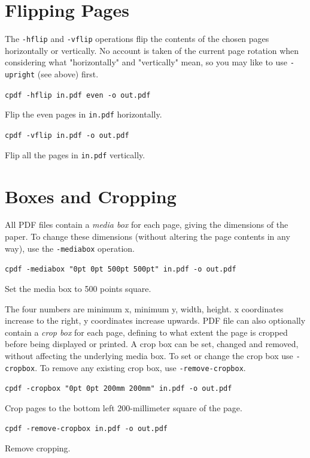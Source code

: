 \documentclass{book}
\begin{document}
  \section{Flipping Pages}
  The \texttt{-hflip} and \texttt{-vflip} operations flip the contents of the
chosen pages horizontally or vertically. No account is taken of the current
page rotation when considering what "horizontally" and "vertically" mean, so you may like to use \texttt{-upright} (see above) first.
  \begin{framed}
    \noindent\small\verb!cpdf -hflip in.pdf even -o out.pdf!

    \vspace{2.5mm}
    \noindent Flip the even pages in \texttt{in.pdf} horizontally.

    \vspace{2.5mm}
    \noindent\verb!cpdf -vflip in.pdf -o out.pdf!

    \vspace{2.5mm}
    \noindent Flip all the pages in \texttt{in.pdf} vertically.
  \end{framed}

  \section{Boxes and Cropping}
  All PDF files contain a \textit{media box} for each page, giving the
dimensions of the paper. To change these dimensions (without altering the page
contents in any way), use the \texttt{-mediabox} operation.
  \begin{framed}
  \noindent\small\verb!cpdf -mediabox "0pt 0pt 500pt 500pt" in.pdf -o out.pdf!

  \vspace{2.5mm}
  \noindent Set the media box to 500 points square.
  \end{framed}
  \noindent The four numbers are minimum x, minimum y, width, height. x
coordinates increase to the right, y coordinates increase upwards.
  PDF file can also optionally contain a \textit{crop box} for each page,
defining to what extent the page is cropped before being displayed or printed.
A crop box can be set, changed and removed, without affecting the underlying
media box. To set or change the crop box use \texttt{-cropbox}. To remove any
existing crop box, use \texttt{-remove-cropbox}.
  \begin{framed}
  \noindent\small\verb!cpdf -cropbox "0pt 0pt 200mm 200mm" in.pdf -o out.pdf!

  \vspace{2.5mm}
  \noindent Crop pages to the bottom left 200-millimeter square of the page.

  \vspace{2.5mm}
  \noindent\verb!cpdf -remove-cropbox in.pdf -o out.pdf!
  
  \vspace{2.5mm}
  \noindent Remove cropping.
  \end{framed}
\end{document}

